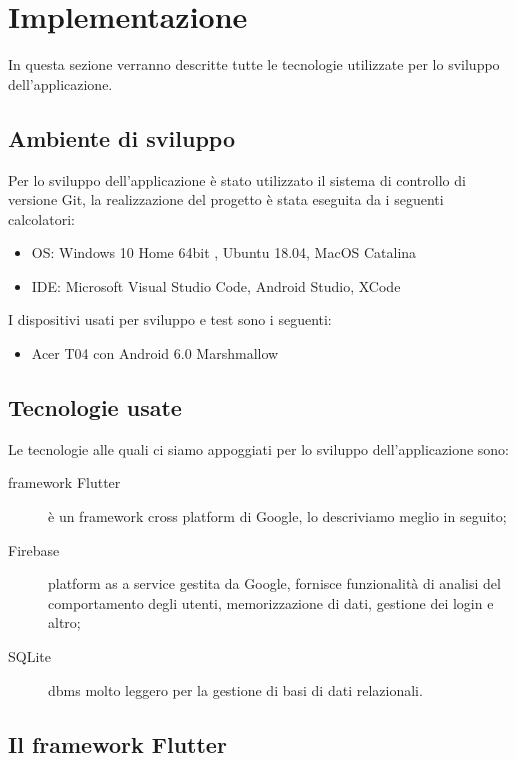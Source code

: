\chapter{Implementazione\label{sec:implementazione}}
In questa sezione verranno descritte tutte le tecnologie utilizzate per lo sviluppo dell'applicazione.
\section{Ambiente di sviluppo\label{sec:ambiente}}
Per lo sviluppo dell'applicazione è stato utilizzato il sistema di controllo di versione Git,  la realizzazione del progetto è stata eseguita da i seguenti calcolatori:
\begin{itemize}
	\item OS: Windows 10 Home 64bit , Ubuntu 18.04, MacOS Catalina
	\item IDE: Microsoft Visual Studio Code, Android Studio, XCode
\end{itemize}

I dispositivi usati per sviluppo e test sono i seguenti:
\begin{itemize}
    \item Acer T04 con Android 6.0 Marshmallow
\end{itemize}

\section{Tecnologie usate\label{sec:tecnologie}}
Le tecnologie alle quali ci siamo appoggiati per lo sviluppo dell'applicazione sono:
\begin{description}
    \item[framework Flutter] è un framework cross platform di Google, lo descriviamo meglio in seguito;
    \item[Firebase] platform as a service gestita da Google, fornisce funzionalità di analisi del comportamento degli utenti, memorizzazione di dati, gestione dei login e altro;
    \item[SQLite] dbms molto leggero per la gestione di basi di dati relazionali.   
\end{description}


\section{Il framework Flutter\label{sec:flutter}}
